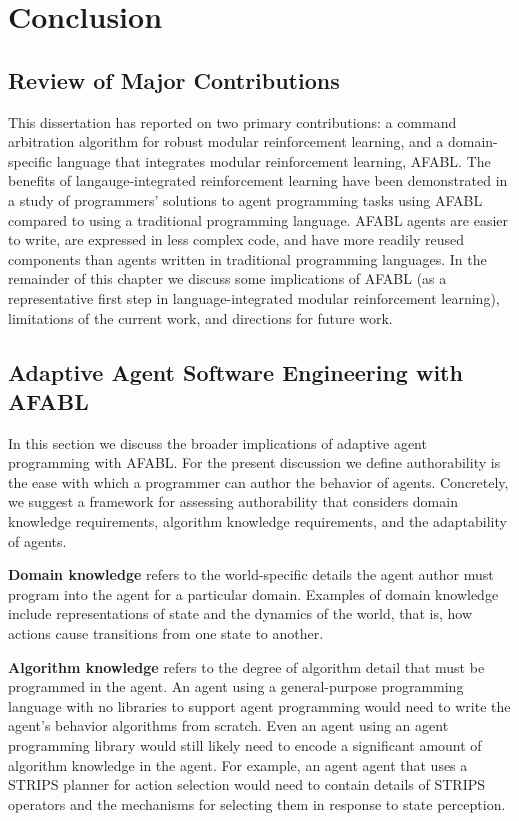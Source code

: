 \chapter{Conclusion}\label{ch:conclusion}

\section{Review of Major Contributions}

This dissertation has reported on two primary contributions: a command arbitration algorithm for robust modular reinforcement learning, and a domain-specific language that integrates modular reinforcement learning, AFABL. The benefits of langauge-integrated reinforcement learning have been demonstrated in a study of programmers' solutions to agent programming tasks using AFABL compared to using a traditional programming language. AFABL agents are easier to write, are expressed in less complex code, and have more readily reused components than agents written in traditional programming languages. In the remainder of this chapter we discuss some implications of AFABL (as a representative first step in language-integrated modular reinforcement learning), limitations of the current work, and directions for future work.

\section{Adaptive Agent Software Engineering with AFABL}

In this section we discuss the broader implications of adaptive agent programming with AFABL. For the present discussion we define authorability is the ease with which a programmer can author the behavior of agents.  Concretely, we suggest a framework for assessing authorability that considers domain knowledge requirements, algorithm knowledge requirements, and the adaptability of agents.

{\bf Domain knowledge} refers to the world-specific details the agent author must program into the agent for a particular domain.  Examples of domain knowledge include representations of state and the dynamics of the world, that is, how actions cause transitions from one state to another.

{\bf Algorithm knowledge} refers to the degree of algorithm detail that must be programmed in the agent.  An agent using a general-purpose programming language with no libraries to support agent programming would need to write the agent's behavior algorithms from scratch. Even an agent using an agent programming library would still likely need to encode a significant amount of algorithm knowledge in the agent. For example, an agent agent that uses a STRIPS planner for action selection would need to contain details of STRIPS operators and the mechanisms for selecting them in response to state perception.


